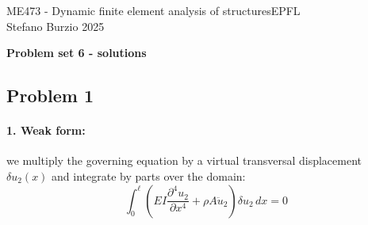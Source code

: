 \documentclass[12pt]{article}
\begin{document}
\noindent ME473 - Dynamic finite element analysis of structures\hfill EPFL\\
Stefano Burzio \hfill 2025\\
\vspace{0.3cm}

\hspace*{\fill}\textbf{\Large Problem set 6 - solutions}\hspace*{\fill}

\hrulefill

\subsection*{Problem 1}
\paragraph{1. Weak form:} we multiply the governing equation by a virtual transversal displacement \( \delta u_2(x) \) and integrate by parts over the domain:
\[
    \int_0^\ell \left( EI \frac{\partial^4 u_2}{\partial x^4} + \rho A \ddot{u}_2 \right) \delta u_2 \, dx = 0
\]
\end{document}
